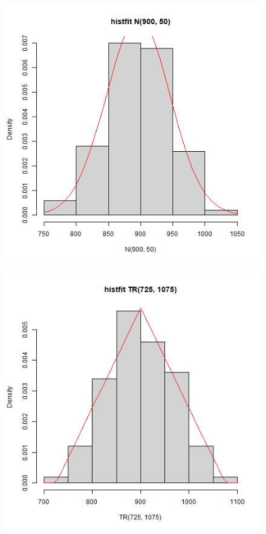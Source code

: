 \documentclass{article}
\begin{document}
\begin{figure}[h!]
\begin{center}
\includegraphics[height = 0.4\textheight, angle = 0]{"w10zad13_histfit_N.png"}
\end{center} \end{figure} 

\newpage
\begin{figure}[h!]
\begin{center}
\includegraphics[height = 0.4\textheight, angle = 0]{"w10zad13_histfit_TR.png"}
\end{center} \end{figure} 
\end{document}
